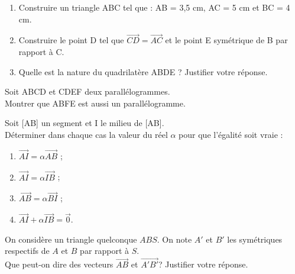 \begin{exercice}

\begin{enumerate}
\item Construire un triangle ABC tel que : AB = 3,5 cm, AC = 5 cm et BC = 4 cm.
\item Construire le point D tel que $\overrightarrow{CD}=\overrightarrow{AC}$   et le point E symétrique de B par rapport à C.
\item Quelle est la nature du quadrilatère ABDE ? Justifier votre réponse.
\end{enumerate}

\end{exercice}


\begin{exercice}

Soit ABCD et CDEF deux parallélogrammes.\\
Montrer que ABFE est aussi un parallélogramme.

\end{exercice}

\begin{exercice}
Soit [AB] un segment et I le milieu de [AB].\\
Déterminer dans chaque cas la valeur du réel $\alpha$ pour que l'égalité soit vraie :

\begin{multicols}{2}
\begin{enumerate}

\item $\overrightarrow{AI}=\alpha\overrightarrow{AB}$ ;
\item $\overrightarrow{AI}=\alpha\overrightarrow{IB}$ ;
\item $\overrightarrow{AB}=\alpha\overrightarrow{BI}$ ;
\item $\overrightarrow{AI}+\alpha\overrightarrow{IB}=\overrightarrow{0}$.

\end{enumerate}
\end{multicols}
\end{exercice}

\begin{exercice}
On considère un triangle quelconque $ABS$. On note $A'$ et $B'$ les symétriques respectifs de $A$ et $B$ par rapport à $S$.\\
Que peut-on dire des vecteurs $\overrightarrow{AB}$ et $\overrightarrow{A'B'}$? Justifier votre réponse.
\end{exercice}

